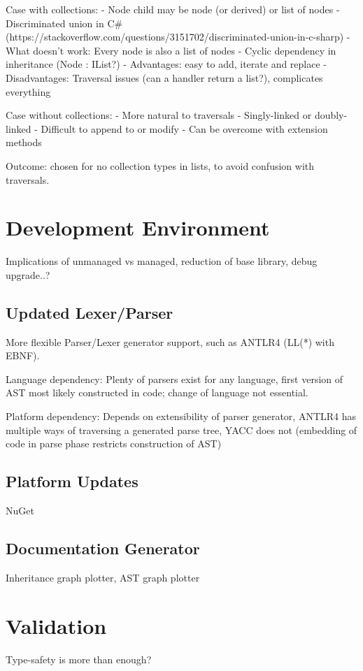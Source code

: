 \documentclass[twoside,openright]{uva-bachelor-thesis}
\begin{document}
		Case with collections:
		- Node child may be node (or derived) or list of nodes
		- Discriminated union in C\# (https://stackoverflow.com/questions/3151702/discriminated-union-in-c-sharp)
		- What doesn't work: Every node is also a list of nodes
		- Cyclic dependency in inheritance (Node : IList?)
		- Advantages: easy to add, iterate and replace
		- Disadvantages: Traversal issues (can a handler return a list?), complicates everything
		
		Case without collections:
		- More natural to traversals
		- Singly-linked or doubly-linked
		- Difficult to append to or modify
		- Can be overcome with extension methods
		
		Outcome: chosen for no collection types in lists, to avoid confusion with traversals.
			
	\section{Development Environment}
		Implications of unmanaged vs managed, reduction of base library, debug upgrade..?
		
		\subsection{Updated Lexer/Parser}
			More flexible Parser/Lexer generator support, such as ANTLR4 (LL(*) with EBNF).
						
			Language dependency: Plenty of parsers exist for any language, first version of AST most likely constructed in code; change of language not essential.
			
			Platform dependency: Depends on extensibility of parser generator, ANTLR4 has multiple ways of traversing a generated parse tree, YACC does not (embedding of code in parse phase restricts construction of AST)
			
		\subsection{Platform Updates}
			NuGet
			
		\subsection{Documentation Generator}
			Inheritance graph plotter, AST graph plotter
	
	\section{Validation}
		Type-safety is more than enough?
		
\end{document}
